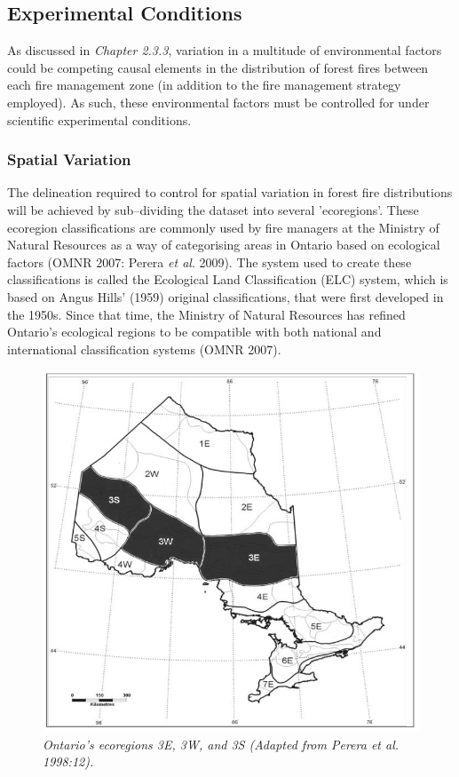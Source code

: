 \begin{spacing}{1.5}
\subsection{Experimental Conditions}

As discussed in \emph{Chapter 2.3.3}, variation in a multitude of  environmental factors could be competing causal elements in the distribution of forest fires between each fire management zone (in addition to the fire management strategy employed). As such, these environmental factors must be controlled for under scientific experimental conditions.

\subsubsection{Spatial Variation}

The delineation required to control for spatial variation in forest fire distributions will be achieved by sub--dividing the dataset into several 'ecoregions'. These ecoregion classifications are commonly used by fire managers at the Ministry of Natural Resources as a way of categorising areas in Ontario based on ecological factors (OMNR 2007: Perera \emph{et al}. 2009). The system used to create these classifications is called the Ecological Land Classification (ELC) system, which is based on Angus Hills' (1959) original classifications, that were first developed in the 1950s. Since that time, the Ministry of Natural Resources has refined Ontario's ecological regions to be compatible with both national and international classification systems (OMNR 2007). \\

\begin{figure}[h]
  \centering
    \includegraphics[width=.85\textwidth]{media/fig6}
      \caption[Ontario's ecoregions 3E, 3W, and 3S]{\emph{Ontario's ecoregions 3E, 3W, and 3S (Adapted from Perera \emph{et al}. 1998:12).}}
        \label{fig6}
\end{figure}


\end{spacing}
